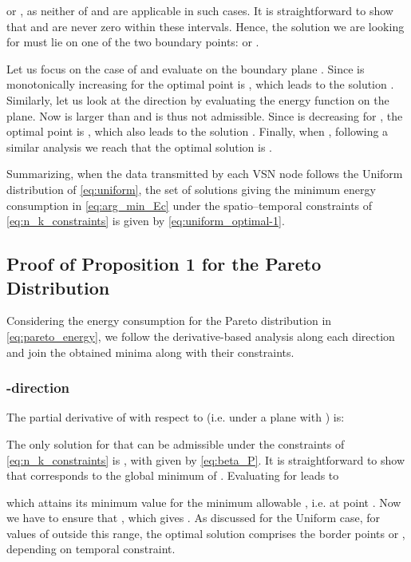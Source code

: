 \documentclass[twocolumn,english]{IEEEtran}
\theoremstyle{plain}
\theoremstyle{definition}
\begin{document}
or , as neither
of  and 
are applicable in such cases. It is straightforward to show that 
and  are never zero within
these intervals. Hence, the solution we are looking for must lie on
one of the two boundary points: 
or .

Let us focus on the case of 
and evaluate  on the boundary plane .
Since  is monotonically increasing
for  the optimal point
is , which leads to the solution .
Similarly, let us look at the  direction by evaluating the energy
function on the  plane. Now 
is larger than  and is thus not admissible. Since
 is decreasing for ,
the optimal point is , which also leads to the
solution . Finally, when
 , following a
similar analysis we reach that the optimal solution is .{} 

Summarizing, when the data transmitted by each VSN node follows the
Uniform distribution of \eqref{eq:uniform}, the set of solutions
giving the minimum energy consumption in \eqref{eq:arg_min_Ec} under
the spatio--temporal constraints of \eqref{eq:n_k_constraints} is
given by \eqref{eq:uniform_optimal-1}.


\subsection{Proof of Proposition 1 for the Pareto Distribution\label{sub:Appendix-Pareto}}

Considering the energy consumption for the Pareto distribution 
in \eqref{eq:pareto_energy}, we follow the derivative-based analysis
along each direction and join the obtained minima along with their
constraints.


\subsubsection{-direction}

The partial derivative of  with respect to  (i.e.
under a plane  with ) is: 

The only solution for 
that can be admissible under the constraints of \eqref{eq:n_k_constraints}
is , with 
given by \eqref{eq:beta_P}. It is straightforward to show that 
corresponds to the global minimum of .
Evaluating  for  leads to




\noindent which attains its minimum value for the minimum allowable
, i.e. at point .
Now we have to ensure that ,
which gives .
As discussed for the Uniform case, for values of 
outside this range, the optimal solution comprises the border points
 or ,
depending on temporal constraint.
\end{document}
